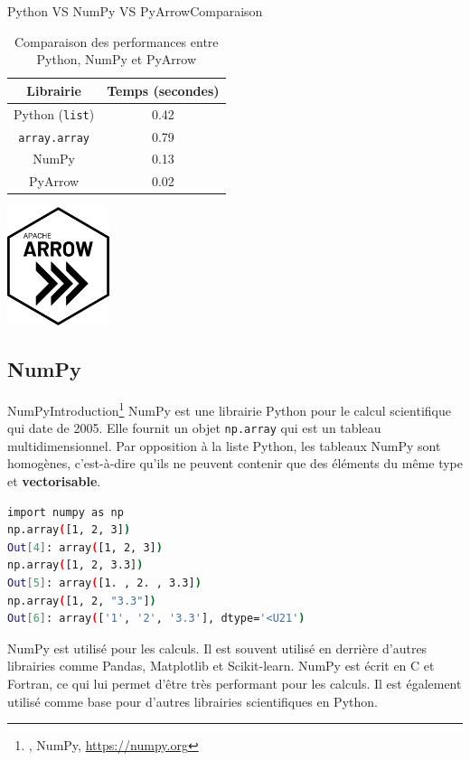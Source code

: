 \documentclass{beamer}
\begin{document}
    \begin{frame}{Python VS NumPy VS PyArrow}{Comparaison}
        \begin{table}[ht]
            \centering
            \begin{tabular}{|c|c|}
                \hline
                \textbf{Librairie}        & \textbf{Temps (secondes)} \\
                \hline
                Python (\lstinline{list}) & 0.42                      \\
                \hline
                \lstinline{array.array}   & 0.79                      \\
                \hline
                NumPy                     & 0.13                      \\
                \hline
                PyArrow                   & 0.02                      \\
                \hline
            \end{tabular}
            \caption{Comparaison des performances entre Python, NumPy et PyArrow}
        \end{table}
        \centering
        \includegraphics[width=3cm]{image/arrow-logo}
    \end{frame}

    \subsection{NumPy}\label{numpy}
    \begin{frame}[fragile]{NumPy}{Introduction\footnote{\label{numpy-website}, NumPy, \url{https://numpy.org}}}
        \small
        NumPy est une librairie Python pour le calcul scientifique qui date de 2005.
        Elle fournit un objet \lstinline{np.array} qui est un tableau multidimensionnel.
        Par opposition à la liste Python, les tableaux NumPy sont homogènes, c'est-à-dire qu'ils ne peuvent contenir que des éléments du même type et \textbf{vectorisable}.
        \begin{lstlisting}[language=bash]
import numpy as np
np.array([1, 2, 3])
Out[4]: array([1, 2, 3])
np.array([1, 2, 3.3])
Out[5]: array([1. , 2. , 3.3])
np.array([1, 2, "3.3"])
Out[6]: array(['1', '2', '3.3'], dtype='<U21')
        \end{lstlisting}
        NumPy est utilisé pour les calculs.
        Il est souvent utilisé en derrière d'autres librairies comme Pandas, Matplotlib et Scikit-learn.
        \bigbreak
        NumPy est écrit en C et Fortran, ce qui lui permet d'être très performant pour les calculs.
        Il est également utilisé comme base pour d'autres librairies scientifiques en Python.
    \end{frame}
\end{document}
